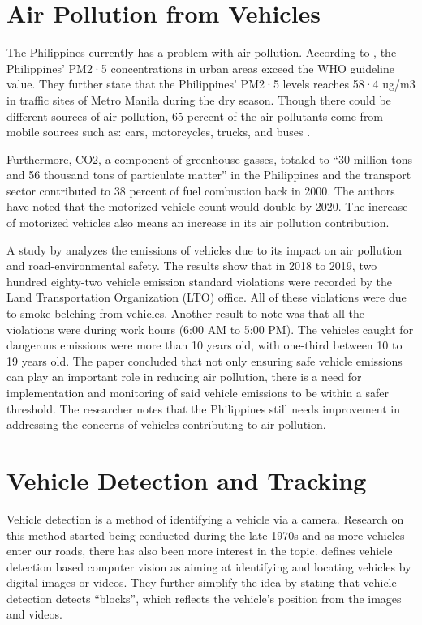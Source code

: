 \section{Air Pollution from Vehicles}
The Philippines currently has a problem with air pollution. According to \cite{TANTENGCO2022}, the Philippines’ PM2·5 concentrations in urban areas exceed the WHO guideline value. They further state that the Philippines’ PM2·5 levels reaches 58·4 ug/m3 in traffic sites of Metro Manila during the dry season. Though there could be different sources of air pollution, 65 percent of the air pollutants come from mobile sources such as: cars, motorcycles, trucks, and buses \cite{EMB_2015}.

	Furthermore, CO2, a component of greenhouse gasses, totaled  to “30 million tons and 56 thousand tons of particulate matter” \cite{FabianGota2009} in the Philippines and the transport sector contributed to 38 percent of fuel combustion back in 2000. The authors have noted that the motorized vehicle count would double by 2020. The increase of motorized vehicles also means an increase in its air pollution contribution. 

A study by \cite{lu_2022} analyzes the emissions of vehicles due to its impact on air pollution and road-environmental safety. The results show that in 2018 to 2019, two hundred eighty-two vehicle emission standard violations were recorded by the Land Transportation Organization (LTO) office. All of these violations were due to smoke-belching from vehicles. Another result to note was that all the violations were during work hours (6:00 AM to 5:00 PM). The vehicles caught for dangerous emissions were more than 10 years old, with one-third between 10 to 19 years old. The paper concluded that not only ensuring safe vehicle emissions can play an important role in reducing air pollution, there is a need for implementation and monitoring of said vehicle emissions to be within a safer threshold. The researcher notes that the Philippines still needs improvement in addressing the concerns of vehicles contributing to air pollution.


\section{Vehicle Detection and Tracking}

	Vehicle detection is a method of identifying a vehicle via a camera. Research on this method started being conducted during the late 1970s \cite{NathDeb2012} and as more vehicles enter our roads, there has also been more interest in the topic.  \cite{Meng_2020} defines vehicle detection based computer vision as aiming at identifying and locating vehicles by digital images or videos. They further simplify the idea by stating that vehicle detection detects “blocks”, which reflects the vehicle’s position from the images and videos.

